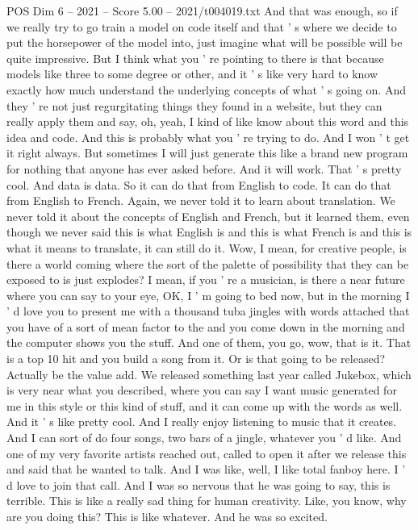 \begin{textsample}{POS Dim 6 – 2021 – Score 5.00 – 2021/t004019.txt}
And that was enough, so if we really try to go train a model on code itself and that ' s where we decide to put the horsepower of the model into, just imagine what will be possible will be quite impressive.
But I think what you ' re pointing to there is that because models like three to some degree or other, and it ' s like very hard to know exactly how much understand the underlying concepts of what ' s going on.
And they ' re not just regurgitating things they found in a website, but they can really apply them and say, oh, yeah, I kind of like know about this word and this idea and code.
And this is probably what you ' re trying to do.
And I won ' t get it right always.
But sometimes I will just generate this like a brand new program for nothing that anyone has ever asked before.
And it will work.
That ' s pretty cool.
And data is data.
So it can do that from English to code.
It can do that from English to French.
Again, we never told it to learn about translation.
We never told it about the concepts of English and French, but it learned them, even though we never said this is what English is and this is what French is and this is what it means to translate, it can still do it.
Wow, I mean, for creative people, is there a world coming where the sort of the palette of possibility that they can be exposed to is just explodes?
I mean, if you ' re a musician, is there a near future where you can say to your eye, OK, I ' m going to bed now, but in the morning I ' d love you to present me with a thousand tuba jingles with words attached that you have of a sort of mean factor to the and you come down in the morning and the computer shows you the stuff.
And one of them, you go, wow, that is it.
That is a top 10 hit and you build a song from it.
Or is that going to be released?
Actually be the value add.
We released something last year called Jukebox, which is very near what you described, where you can say I want music generated for me in this style or this kind of stuff, and it can come up with the words as well.
And it ' s like pretty cool.
And I really enjoy listening to music that it creates.
And I can sort of do four songs, two bars of a jingle, whatever you ' d like.
And one of my very favorite artists reached out, called to open it after we release this and said that he wanted to talk.
And I was like, well, I like total fanboy here.
I ' d love to join that call.
And I was so nervous that he was going to say, this is terrible.
This is like a really sad thing for human creativity.
Like, you know, why are you doing this?
This is like whatever.
And he was so excited.

\end{textsample}
